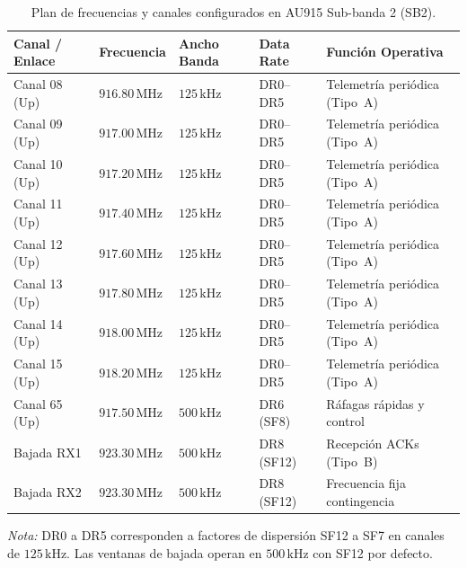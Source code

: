 \documentclass[12pt,oneside,openany,spanish,oldfontcommands]{memoir}
\begin{document}
\begin{table}[H]
\centering
\small
\caption{Plan de frecuencias y canales configurados en AU915 Sub-banda 2 (SB2).}\label{tab:frecuencias-au915-diseno}
\begin{tabularx}{\textwidth}{>{\raggedright\arraybackslash}p{2.4cm} >{\centering\arraybackslash}p{2.2cm} >{\centering\arraybackslash}p{2.0cm} >{\centering\arraybackslash}p{2.6cm} >{\raggedright\arraybackslash}X}
\toprule
\textbf{Canal / Enlace} & \textbf{Frecuencia} & \textbf{Ancho Banda} & \textbf{Data Rate} & \textbf{Función Operativa} \\
\midrule
Canal 08 (Up) & $916.80\,\text{MHz}$ & $125\,\text{kHz}$ & DR0--DR5 & Telemetría periódica (Tipo~A) \\
Canal 09 (Up) & $917.00\,\text{MHz}$ & $125\,\text{kHz}$ & DR0--DR5 & Telemetría periódica (Tipo~A) \\
Canal 10 (Up) & $917.20\,\text{MHz}$ & $125\,\text{kHz}$ & DR0--DR5 & Telemetría periódica (Tipo~A) \\
Canal 11 (Up) & $917.40\,\text{MHz}$ & $125\,\text{kHz}$ & DR0--DR5 & Telemetría periódica (Tipo~A) \\
Canal 12 (Up) & $917.60\,\text{MHz}$ & $125\,\text{kHz}$ & DR0--DR5 & Telemetría periódica (Tipo~A) \\
Canal 13 (Up) & $917.80\,\text{MHz}$ & $125\,\text{kHz}$ & DR0--DR5 & Telemetría periódica (Tipo~A) \\
Canal 14 (Up) & $918.00\,\text{MHz}$ & $125\,\text{kHz}$ & DR0--DR5 & Telemetría periódica (Tipo~A) \\
Canal 15 (Up) & $918.20\,\text{MHz}$ & $125\,\text{kHz}$ & DR0--DR5 & Telemetría periódica (Tipo~A) \\
\midrule
Canal 65 (Up) & $917.50\,\text{MHz}$ & $500\,\text{kHz}$ & DR6 (SF8) & Ráfagas rápidas y control \\
\midrule
Bajada RX1    & $923.30\,\text{MHz}$ & $500\,\text{kHz}$ & DR8 (SF12) & Recepción ACKs (Tipo~B) \\
Bajada RX2    & $923.30\,\text{MHz}$ & $500\,\text{kHz}$ & DR8 (SF12) & Frecuencia fija contingencia \\
\bottomrule
\end{tabularx}
\vspace{0.15cm}
\footnotesize
\textit{Nota:} DR0 a DR5 corresponden a factores de dispersión SF12 a SF7 en canales de $125\,\text{kHz}$. Las ventanas de bajada operan en $500\,\text{kHz}$ con SF12 por defecto.
\end{table}
\end{document}
